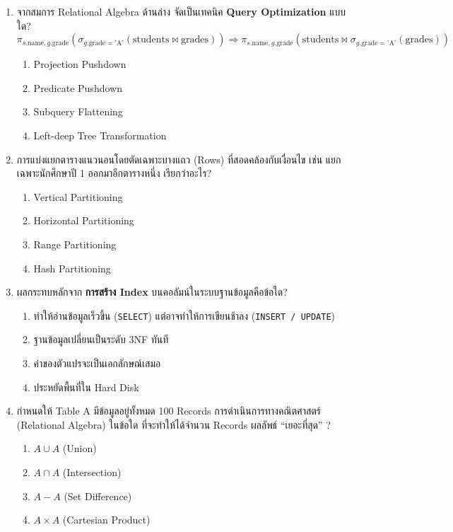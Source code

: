 \documentclass[a4paper,12pt]{article}
\begin{document}
\begin{enumerate}[label=\textbf{\arabic*.}]
    \item จากสมการ Relational Algebra ด้านล่าง จัดเป็นเทคนิค \textbf{Query Optimization} แบบใด?\\
    \[ \pi_{s.\text{name}, g.\text{grade}} (\sigma_{g.\text{grade} = \text{'A'}} (\text{students} \bowtie \text{grades})) \Rightarrow \pi_{s.\text{name}, g.\text{grade}} (\text{students} \bowtie \sigma_{g.\text{grade} = \text{'A'}} (\text{grades})) \]
    \begin{enumerate}[label=\alph*.]
        \item Projection Pushdown
        \item Predicate Pushdown
        \item Subquery Flattening
        \item Left-deep Tree Transformation
    \end{enumerate}

    \item การแบ่งแยกตารางแนวนอนโดยตัดเฉพาะบางแถว (Rows) ที่สอดคล้องกับเงื่อนไข เช่น แยกเฉพาะนักศึกษาปี 1 ออกมาอีกตารางหนึ่ง เรียกว่าอะไร?
    \begin{enumerate}[label=\alph*.]
        \item Vertical Partitioning
        \item Horizontal Partitioning
        \item Range Partitioning
        \item Hash Partitioning
    \end{enumerate}

    \item ผลกระทบหลักจาก \textbf{การสร้าง Index} บนคอลัมน์ในระบบฐานข้อมูลคือข้อใด?
    \begin{enumerate}[label=\alph*.]
        \item ทำให้อ่านข้อมูลเร็วขึ้น (\texttt{SELECT}) แต่อาจทำให้การเขียนช้าลง (\texttt{INSERT / UPDATE})
        \item ฐานข้อมูลเปลี่ยนเป็นระดับ 3NF ทันที
        \item ค่าของตัวแปรจะเป็นเอกลักษณ์เสมอ
        \item ประหยัดพื้นที่ใน Hard Disk
    \end{enumerate}

    \item กำหนดให้ Table A มีข้อมูลอยู่ทั้งหมด 100 Records การดำเนินการทางคณิตศาสตร์ (Relational Algebra) ในข้อใด ที่จะทำให้ได้จำนวน Records ผลลัพธ์ ``เยอะที่สุด'' ?
    \begin{enumerate}[label=\alph*.]
        \item $ A \cup A $ (Union)
        \item $ A \cap A $ (Intersection)
        \item $ A - A $ (Set Difference)
        \item $ A \times A $ (Cartesian Product)
    \end{enumerate}


\end{enumerate}
\end{document}
